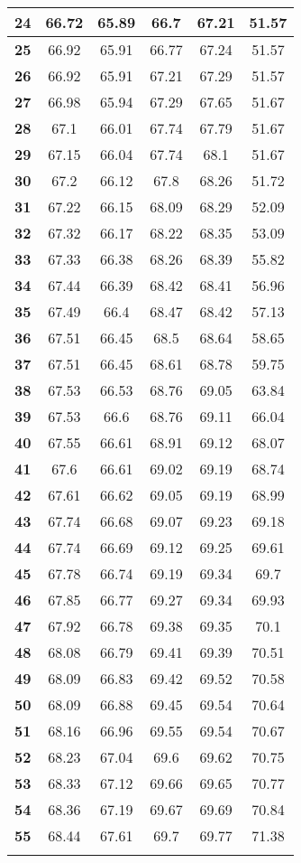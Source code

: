 \begin{longtable}{|c|c|c|c|c|c|}
\textbf{24} & 66.72 & 65.89 & 66.7 & 67.21 & 51.57 \\ \hline 
\textbf{25} & 66.92 & 65.91 & 66.77 & 67.24 & 51.57 \\ \hline 
\textbf{26} & 66.92 & 65.91 & 67.21 & 67.29 & 51.57 \\ \hline 
\textbf{27} & 66.98 & 65.94 & 67.29 & 67.65 & 51.67 \\ \hline 
\textbf{28} & 67.1 & 66.01 & 67.74 & 67.79 & 51.67 \\ \hline 
\textbf{29} & 67.15 & 66.04 & 67.74 & 68.1 & 51.67 \\ \hline 
\textbf{30} & 67.2 & 66.12 & 67.8 & 68.26 & 51.72 \\ \hline 
\textbf{31} & 67.22 & 66.15 & 68.09 & 68.29 & 52.09 \\ \hline 
\textbf{32} & 67.32 & 66.17 & 68.22 & 68.35 & 53.09 \\ \hline 
\textbf{33} & 67.33 & 66.38 & 68.26 & 68.39 & 55.82 \\ \hline 
\textbf{34} & 67.44 & 66.39 & 68.42 & 68.41 & 56.96 \\ \hline 
\textbf{35} & 67.49 & 66.4 & 68.47 & 68.42 & 57.13 \\ \hline 
\textbf{36} & 67.51 & 66.45 & 68.5 & 68.64 & 58.65 \\ \hline 
\textbf{37} & 67.51 & 66.45 & 68.61 & 68.78 & 59.75 \\ \hline 
\textbf{38} & 67.53 & 66.53 & 68.76 & 69.05 & 63.84 \\ \hline 
\textbf{39} & 67.53 & 66.6 & 68.76 & 69.11 & 66.04 \\ \hline 
\textbf{40} & 67.55 & 66.61 & 68.91 & 69.12 & 68.07 \\ \hline 
\textbf{41} & 67.6 & 66.61 & 69.02 & 69.19 & 68.74 \\ \hline 
\textbf{42} & 67.61 & 66.62 & 69.05 & 69.19 & 68.99 \\ \hline 
\textbf{43} & 67.74 & 66.68 & 69.07 & 69.23 & 69.18 \\ \hline 
\textbf{44} & 67.74 & 66.69 & 69.12 & 69.25 & 69.61 \\ \hline 
\textbf{45} & 67.78 & 66.74 & 69.19 & 69.34 & 69.7 \\ \hline 
\textbf{46} & 67.85 & 66.77 & 69.27 & 69.34 & 69.93 \\ \hline 
\textbf{47} & 67.92 & 66.78 & 69.38 & 69.35 & 70.1 \\ \hline 
\textbf{48} & 68.08 & 66.79 & 69.41 & 69.39 & 70.51 \\ \hline 
\textbf{49} & 68.09 & 66.83 & 69.42 & 69.52 & 70.58 \\ \hline 
\textbf{50} & 68.09 & 66.88 & 69.45 & 69.54 & 70.64 \\ \hline 
\textbf{51} & 68.16 & 66.96 & 69.55 & 69.54 & 70.67 \\ \hline 
\textbf{52} & 68.23 & 67.04 & 69.6 & 69.62 & 70.75 \\ \hline 
\textbf{53} & 68.33 & 67.12 & 69.66 & 69.65 & 70.77 \\ \hline 
\textbf{54} & 68.36 & 67.19 & 69.67 & 69.69 & 70.84 \\ \hline 
\textbf{55} & 68.44 & 67.61 & 69.7 & 69.77 & 71.38 \\ \hline 

    \caption[]{}
    \label{Tab:}
\end{longtable}